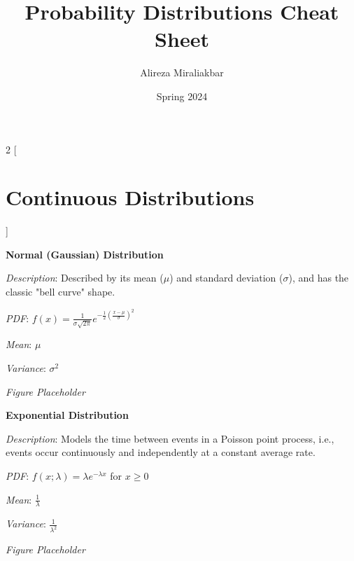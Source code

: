 \documentclass{article}
\title{Probability Distributions Cheat Sheet}
\author{Alireza Miraliakbar}
\date{Spring 2024}
\begin{document}
\maketitle

\begin{multicols}{2}
[
\section*{Continuous Distributions}
]

\begin{mdframed}
\textbf{Normal (Gaussian) Distribution}

\textit{Description}: Described by its mean ($\mu$) and standard deviation ($\sigma$), and has the classic "bell curve" shape.

\textit{PDF}: $f(x) = \frac{1}{\sigma\sqrt{2\pi}} e^{-\frac{1}{2}\left(\frac{x-\mu}{\sigma}\right)^2}$

\textit{Mean}: $\mu$

\textit{Variance}: $\sigma^2$

\textit{Figure Placeholder}

\end{mdframed}

\begin{mdframed}
\textbf{Exponential Distribution}

\textit{Description}: Models the time between events in a Poisson point process, i.e., events occur continuously and independently at a constant average rate.

\textit{PDF}: $f(x;\lambda) = \lambda e^{-\lambda x}$ for $x \geq 0$

\textit{Mean}: $\frac{1}{\lambda}$

\textit{Variance}: $\frac{1}{\lambda^2}$

\textit{Figure Placeholder}

\end{mdframed}

\end{multicols}
\end{document}
